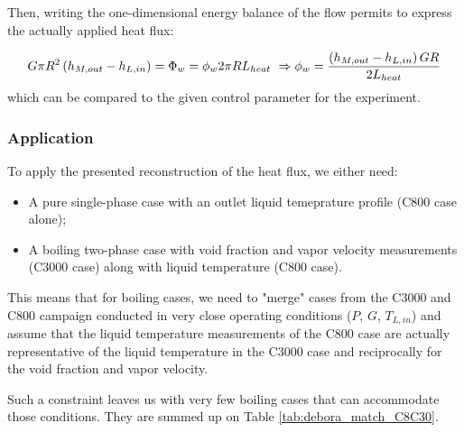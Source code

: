 \npar

Then, writing the one-dimensional energy balance of the flow permits to express the actually applied heat flux: 

\begin{equation}
G \pi R^{2} \left( h_{M,out} - h_{L,in} \right) = \Phi_{w} = \phi_{w} 2\pi R L_{heat} \ \Rightarrow \phi_{w} = \frac{\left( h_{M,out}-h_{L,in} \right)GR}{2L_{heat}}
\end{equation}
which can be compared to the given control parameter for the experiment.

\subsubsection{Application}

To apply the presented reconstruction of the heat flux, we either need: 

\begin{itemize}
\item A pure single-phase case with an outlet liquid temeprature profile (C800 case alone);
\item A boiling two-phase case with void fraction and vapor velocity measurements (C3000 case) along with liquid temperature (C800 case).
\end{itemize}

This means that for boiling cases, we need to "merge" cases from the C3000 and C800 campaign conducted in very close operating conditions ($P$, $G$, $T_{L,in}$) and assume that the liquid temperature measurements of the C800 case are actually representative of the liquid temperature in the C3000 case and reciprocally for the void fraction and vapor velocity.

\npar

Such a constraint leaves us with very few boiling cases that can accommodate those conditions. They are summed up on Table \ref{tab:debora_match_C8C30}.


